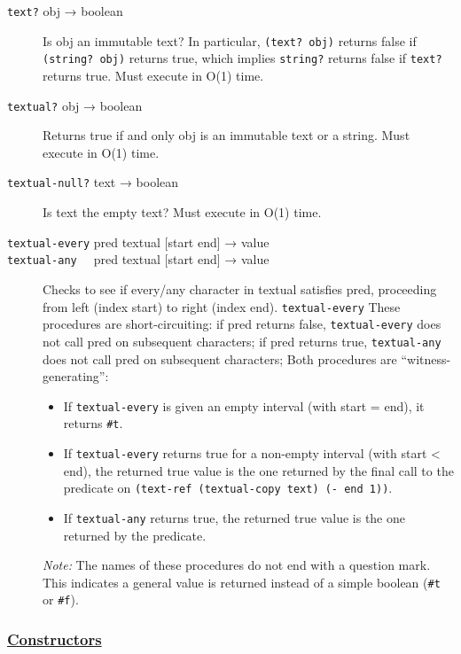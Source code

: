 \begin{description}
\item[ \href{}{} \texttt{text?} obj → boolean ]
Is obj an immutable text? In particular, \texttt{(text?\ obj)} returns
false if \texttt{(string?\ obj)} returns true, which implies
\texttt{string?} returns false if \texttt{text?} returns true. Must
execute in O(1) time.
\item[ \href{}{} \texttt{textual?} obj → boolean ]
Returns true if and only obj is an immutable text or a string. Must
execute in O(1) time.
\item[ \href{}{} \texttt{textual-null?} text → boolean ]
Is text the empty text? Must execute in O(1) time.
\item[ \href{}{} \href{}{} \texttt{textual-every} pred textual {[}start
end{]} → value\\
\texttt{textual-any~~} pred textual {[}start end{]} → value ]
Checks to see if every/any character in textual satisfies pred,
proceeding from left (index start) to right (index end).
\texttt{textual-every} These procedures are short-circuiting: if pred
returns false, \texttt{textual-every} does not call pred on subsequent
characters; if pred returns true, \texttt{textual-any} does not call
pred on subsequent characters; Both procedures are
``witness-generating'':

\begin{itemize}
\tightlist
\item
  If \texttt{textual-every} is given an empty interval (with start =
  end), it returns \texttt{\#t}.
\item
  If \texttt{textual-every} returns true for a non-empty interval (with
  start \textless{} end), the returned true value is the one returned by
  the final call to the predicate on
  \texttt{(text-ref\ (textual-copy\ text)\ (-\ end\ 1))}.
\item
  If \texttt{textual-any} returns true, the returned true value is the
  one returned by the predicate.
\end{itemize}

\emph{Note:} The names of these procedures do not end with a question
mark. This indicates a general value is returned instead of a simple
boolean (\texttt{\#t} or \texttt{\#f}).
\end{description}

\subsubsection{\texorpdfstring{\href{}{Constructors}}{Constructors}}\label{constructors}

